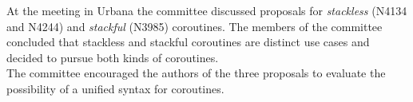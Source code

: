 At the meeting in Urbana the committee discussed proposals for \emph{stackless}
(N4134\cite{N4134} and N4244\cite{N4244}) and \emph{stackful}
(N3985\cite{N3985}) coroutines. The members of the committee concluded that
stackless and stackful coroutines are distinct use cases and decided to pursue
both kinds of coroutines.\\
The committee encouraged the authors of the three proposals to evaluate the
possibility of a unified syntax for coroutines.
